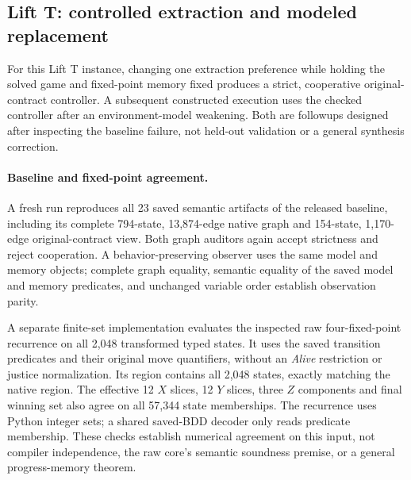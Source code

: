 \subsection*{Lift T: controlled extraction and modeled replacement}
\label{supp:lift-causal}
For this Lift T instance, changing one extraction preference while
holding the solved game and fixed-point memory fixed produces a strict,
cooperative original-contract controller. A subsequent constructed
execution uses the checked controller after an environment-model
weakening. Both are followups designed after inspecting the baseline
failure, not held-out validation or a general synthesis correction.


\paragraph{Baseline and fixed-point agreement.}
A fresh run reproduces all 23 saved semantic artifacts of the released
baseline, including its complete 794-state, 13,874-edge native graph and
154-state, 1,170-edge original-contract view. Both graph auditors again
accept strictness and reject cooperation. A behavior-preserving observer
uses the same model and memory objects; complete graph equality,
semantic equality of the saved model and memory predicates, and
unchanged variable order establish observation parity.

A separate finite-set implementation evaluates the inspected raw
four-fixed-point recurrence on all 2,048 transformed typed states.
It uses the saved transition predicates and their original move
quantifiers, without an \emph{Alive} restriction or justice normalization.
Its region contains all 2,048 states, exactly matching the native region.
The effective 12 $X$ slices, 12 $Y$ slices, three $Z$ components and final
winning set also agree on all 57,344 state memberships.
The recurrence uses Python integer sets; a shared saved-BDD decoder
only reads predicate membership. These checks establish numerical
agreement on this input, not compiler independence, the raw core's
semantic soundness premise, or a general progress-memory theorem.

